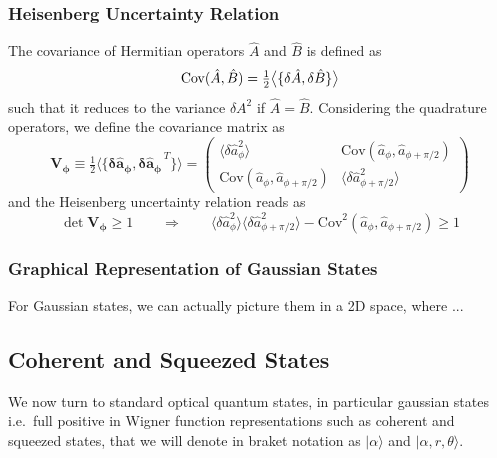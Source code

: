 \subsubsection{Heisenberg Uncertainty Relation }
The covariance of Hermitian operators \(\hat{A}\) and \(\hat{B}\) is defined as
\begin{equation}
    \mathrm{Cov}(\hat{A},\hat B) = \tfrac12 \big\langle \{ \delta\hat{A}, \delta\hat{B} \} \big\rangle \\
\end{equation}
such that it reduces to the variance $\delta A^2$ if $\hat{A}=\hat{B}$. Considering the quadrature operators, we define the covariance matrix as
\begin{equation}
\mathbf{V_\phi} \equiv \tfrac12 \big\langle \{  \mathbf{\delta \hat{a}_\phi},  \mathbf{\delta \hat{a}_\phi}^{\,T} \} \big\rangle
= \begin{pmatrix}
\langle \delta \hat{a}_\phi^2 \rangle &
\mathrm{Cov}(\hat{a}_\phi,\hat{a}_{\phi+\pi/2}) \\[4pt]
\mathrm{Cov}(\hat{a}_\phi,\hat{a}_{\phi+\pi/2})  &
\langle \delta \hat{a}_{\phi+\pi/2}^2 \rangle 
\end{pmatrix}
\end{equation}
and the Heisenberg uncertainty relation reads as
\begin{equation}
  \det \mathbf{V_\phi} \geq 1 \qquad \Rightarrow \qquad \langle  \delta \hat{a}^2_\phi \rangle \langle  \delta \hat{a}^2_{\phi+\pi/2} \rangle  - \mathrm{Cov}^2(\hat{a}_\phi,\hat{a}_{\phi+\pi/2})\geq 1
\end{equation}


\subsubsection{Graphical Representation of Gaussian States}
For Gaussian states, we can actually picture them in a 2D space, where ... 

\subsection{Coherent and Squeezed States}
We now turn to standard optical quantum states, in particular gaussian states i.e.\ full positive in Wigner function representations such as coherent and squeezed states, that we will denote in braket notation as $|\alpha\rangle$ and $|\alpha,r, \theta\rangle $.
